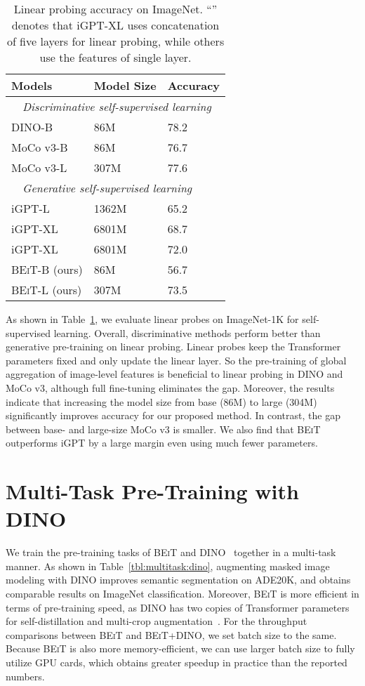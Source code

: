 \documentclass{article}
\newcommand\our{\textsc{BEiT}}
\begin{document}
\begin{table}[H]
\centering
\begin{tabular}{lll}
\toprule
\bf Models & \bf Model Size & \bf Accuracy \\ \midrule
\multicolumn{3}{l}{~~\textit{Discriminative self-supervised learning}} \\
DINO-B~\citep{dino} & 86M & 78.2 \\
MoCo v3-B~\citep{mocov3} & 86M & 76.7 \\
MoCo v3-L~\citep{mocov3} & 307M & 77.6 \\
\midrule
\multicolumn{3}{l}{~~\textit{Generative self-supervised learning}} \\
iGPT-L~\citep{igpt} & 1362M & 65.2 \\
iGPT-XL~\citep{igpt} & 6801M & 68.7 \\
iGPT-XL~\citep{igpt} & 6801M & 72.0 \\
\our{}-B (ours) & 86M & 56.7 \\
\our{}-L (ours) & 307M & 73.5 \\
\bottomrule
\end{tabular}
\caption{
Linear probing accuracy on ImageNet. ``'' denotes that iGPT-XL uses concatenation of five layers for linear probing, while others use the features of single layer.
}
\label{tbl:linear_probe}
\end{table}


As shown in Table~\ref{tbl:linear_probe}, we evaluate linear probes on ImageNet-1K for self-supervised learning.
Overall, discriminative methods perform better than generative pre-training on linear probing.
Linear probes keep the Transformer parameters fixed and only update the linear layer. So the pre-training of global aggregation of image-level features is beneficial to linear probing in DINO and MoCo v3, although full fine-tuning eliminates the gap.
Moreover, the results indicate that increasing the model size from base (86M) to large (304M) significantly improves accuracy for our proposed method.
In contrast, the gap between base- and large-size MoCo v3 is smaller.
We also find that \our{} outperforms iGPT by a large margin even using much fewer parameters.


\section{Multi-Task Pre-Training with DINO}
\label{app:multitask:dino}

We train the pre-training tasks of \our{} and DINO~\citep{dino} together in a multi-task manner.
As shown in Table~\ref{tbl:multitask:dino}, augmenting masked image modeling with DINO improves semantic segmentation on ADE20K, and obtains comparable results on ImageNet classification.
Moreover, \our{} is more efficient in terms of pre-training speed, as DINO has two copies of Transformer parameters for self-distillation and multi-crop augmentation~\citep{swav}.
For the throughput comparisons between \our{} and \our{}+DINO, we set batch size to the same.
Because \our{} is also more memory-efficient, we can use larger batch size to fully utilize GPU cards, which obtains greater speedup in practice than the reported numbers.
\end{document}
